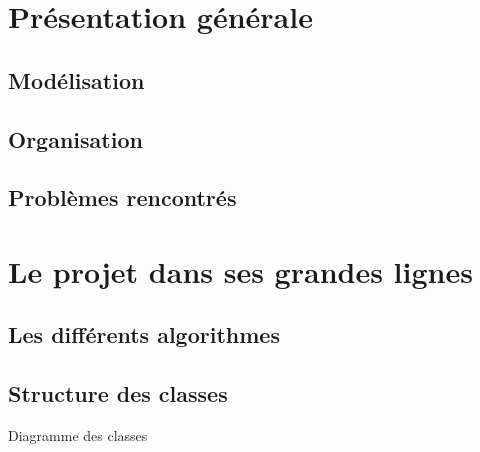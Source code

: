 \documentclass[12pt,french]{article}
\begin{document}
\section{Présentation générale}
\subsection{Modélisation}
\subsection{Organisation}
\subsection{Problèmes rencontrés}


\section{Le projet dans ses grandes lignes}
\subsection{Les différents algorithmes}
\subsection{Structure des classes}
Diagramme des classes
\end{document}

